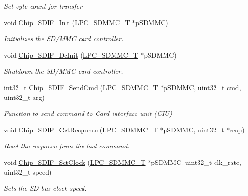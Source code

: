 \begin{DoxyCompactItemize}
\begin{DoxyCompactList}\small\item\em Set byte count for transfer. \end{DoxyCompactList}\item 
void \hyperlink{group___s_d_i_f__18_x_x__43_x_x_gaebb123439fc67c641876a795fce6160f}{Chip\+\_\+\+S\+D\+I\+F\+\_\+\+Init} (\hyperlink{struct_l_p_c___s_d_m_m_c___t}{L\+P\+C\+\_\+\+S\+D\+M\+M\+C\+\_\+T} $\ast$p\+S\+D\+M\+MC)
\begin{DoxyCompactList}\small\item\em Initializes the S\+D/\+M\+MC card controller. \end{DoxyCompactList}\item 
void \hyperlink{group___s_d_i_f__18_x_x__43_x_x_gaec05814b0956550eb414ed61a2845eb6}{Chip\+\_\+\+S\+D\+I\+F\+\_\+\+De\+Init} (\hyperlink{struct_l_p_c___s_d_m_m_c___t}{L\+P\+C\+\_\+\+S\+D\+M\+M\+C\+\_\+T} $\ast$p\+S\+D\+M\+MC)
\begin{DoxyCompactList}\small\item\em Shutdown the S\+D/\+M\+MC card controller. \end{DoxyCompactList}\item 
int32\+\_\+t \hyperlink{group___s_d_i_f__18_x_x__43_x_x_ga4cee4237b975343d87b992cf4b90fed2}{Chip\+\_\+\+S\+D\+I\+F\+\_\+\+Send\+Cmd} (\hyperlink{struct_l_p_c___s_d_m_m_c___t}{L\+P\+C\+\_\+\+S\+D\+M\+M\+C\+\_\+T} $\ast$p\+S\+D\+M\+MC, uint32\+\_\+t cmd, uint32\+\_\+t arg)
\begin{DoxyCompactList}\small\item\em Function to send command to Card interface unit (C\+IU) \end{DoxyCompactList}\item 
void \hyperlink{group___s_d_i_f__18_x_x__43_x_x_gaf31ae80f99b27ee56f4ae341670058ca}{Chip\+\_\+\+S\+D\+I\+F\+\_\+\+Get\+Response} (\hyperlink{struct_l_p_c___s_d_m_m_c___t}{L\+P\+C\+\_\+\+S\+D\+M\+M\+C\+\_\+T} $\ast$p\+S\+D\+M\+MC, uint32\+\_\+t $\ast$resp)
\begin{DoxyCompactList}\small\item\em Read the response from the last command. \end{DoxyCompactList}\item 
void \hyperlink{group___s_d_i_f__18_x_x__43_x_x_ga132a1984308917b6297db4ff0a5f9e9f}{Chip\+\_\+\+S\+D\+I\+F\+\_\+\+Set\+Clock} (\hyperlink{struct_l_p_c___s_d_m_m_c___t}{L\+P\+C\+\_\+\+S\+D\+M\+M\+C\+\_\+T} $\ast$p\+S\+D\+M\+MC, uint32\+\_\+t clk\+\_\+rate, uint32\+\_\+t speed)
\begin{DoxyCompactList}\small\item\em Sets the SD bus clock speed. \end{DoxyCompactList}\item 

\end{DoxyCompactItemize}
